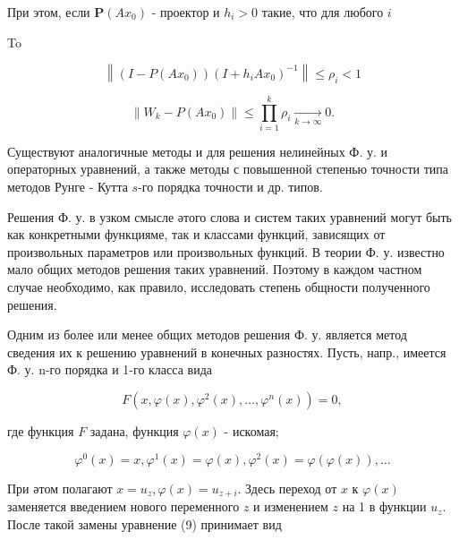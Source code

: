 \documentclass[10pt]{article}
\begin{document}
При этом, если $\boldsymbol{P}\left(A x_{0}\right)$ - проектор и $h_{i}>0$ такие, что для любого $i$



To



\[

\left\|\left(I-P\left(A x_{0}\right)\right)\left(I+h_{i} A x_{0}\right)^{-1}\right\| \leqslant \rho_{i}<1

\]



\[

\left\|W_{k}-P\left(A x_{0}\right)\right\| \leqslant \prod_{i=1}^{k} \rho_{i} \underset{k \rightarrow \infty}{\longrightarrow} 0 .

\]



Существуют аналогичные методы и для решения нелинейных Ф. у. и операторных уравнений, а также методы с повышенной степенью точности типа методов Рунге - Кутта $s$-го порядка точности и др. типов.



Решения Ф. у. в узком смысле әтого слова и систем таких уравнений могут быть как конкретными функцияме, так и классами функций, зависящих от произвольных параметров или произвольных функций. В теории Ф. у. известно мало общих методов решения таких уравнений. Поэтому в каждом частном случае необходимо, как правило, исследовать степень общности полученного решения.



Одним из более или менее общих методов решения Ф. у. является метод сведения их к решению уравнений в конечных разностях. Пусть, напр., имеется Ф. у. n-го порядка и 1-го класса вида



\[

F\left(x, \varphi(x), \varphi^{2}(x), \ldots, \varphi^{n}(x)\right)=0,

\]



где функция $F$ задана, функция $\varphi(x)$ - искомая;



\[

\varphi^{0}(x)=x, \varphi^{1}(x)=\varphi(x), \varphi^{2}(x)=\varphi(\varphi(x)), \ldots

\]



При әтом полагают $x=u_{z}, \varphi(x)=u_{z+i}$. Здесь переход от $x$ к $\varphi(x)$ заменяется введением нового переменного $z$ и изменением $z$ на 1 в функции $u_{z}$. После такой замены уравнение (9) принимает вид
\end{document}
